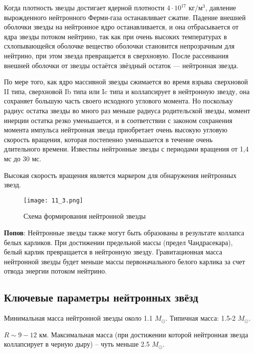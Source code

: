 Когда плотность звезды достигает ядерной плотности $4\cdot10^{17}$ кг/м$^3$, давление вырожденного нейтронного Ферми-газа останавливает сжатие. Падение внешней оболочки звезды на нейтронное ядро останавливается, и она отбрасывается от ядра звезды потоком нейтрино, так как при очень высоких температурах в схлопывающейся оболочке вещество оболочки становится непрозрачным для нейтрино, при этом звезда превращается в сверхновую. После рассеивания внешней оболочки от звезды остаётся звёздный остаток — нейтронная звезда.

По мере того, как ядро массивной звезды сжимается во время взрыва сверхновой II типа, сверхновой Ib типа или Ic типа и коллапсирует в нейтронную звезду, она сохраняет большую часть своего исходного углового момента. Но поскольку радиус остатка звезды во много раз меньше радиуса родительской звезды, момент инерции остатка резко уменьшается, и в соответствии с законом сохранения момента импульса нейтронная звезда приобретает очень высокую угловую скорость вращения, которая постепенно уменьшается в течение очень длительного времени. Известны нейтронные звезды с периодами вращения от 1,4 мс до 30 мс.

Высокая скорость вращения является маркером для обнаружения нейтронных звезд.


\begin{figure}[H]
\centering
\texttt{[image: 11\_3.png]}
\caption{Схема формирования нейтронной звезды}
\end{figure}




\textbf{Попов}: Нейтронные звезды также могут быть образованы в результате коллапса белых карликов. При достижении предельной массы (предел Чандрасекара), белый карлик превращается в нейтронную звезду. Гравитационная масса нейтронной звезды будет меньше массы первоначального белого карлика за счет отвода энергии потоком нейтрино. 




\subsection{Ключевые параметры нейтронных звёзд}

Минимальная масса нейтронной звезды около 1.1 $M_\odot$. Типичная масса: 1.5-2 $M_\odot$. 

$R \sim 9-12$ км. Максимальная масса (при достижении которой нейтронная звезда коллапсирует в черную дыру) -- чуть меньше 2.5 $M_\odot$.

